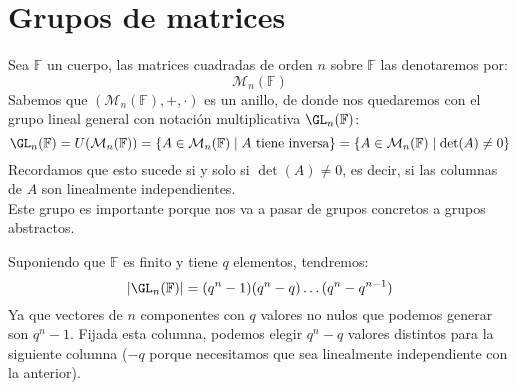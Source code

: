 \section{Grupos de matrices}
Sea $\mathbb{F}$ un cuerpo, las matrices cuadradas de orden $n$ sobre $\mathbb{F}$ las denotaremos por:
\begin{equation*}
    \mathcal{M}_n(\mathbb{F})
\end{equation*}
Sabemos que $(\mathcal{M}_n(\mathbb{F}), +, \cdot)$ es un anillo, de donde nos quedaremos con el grupo lineal general con notación multiplicativa $\GL_n(\mathbb{F})$:
\begin{equation*}
    \GL_n(\mathbb{F}) = U(\mathcal{M}_n(\mathbb{F})) = \{A\in \mathcal{M}_n(\mathbb{F}) \mid A \text{\ tiene inversa} \} = \{A \in \mathcal{M}_n(\mathbb{F})\mid \det(A)\neq 0 \}
\end{equation*}
Recordamos que esto sucede si y solo si $\det(A)\neq 0$, es decir, si las columnas de $A$ son linealmente independientes.\\

Este grupo es importante porque nos va a pasar de grupos concretos a grupos abstractos.

Suponiendo que $\mathbb{F}$ es finito y tiene $q$ elementos, tendremos:
\begin{equation*}
    |\GL_n(\mathbb{F})| = (q^n-1)(q^n-q) \ldots (q^n - q^{n-1})
\end{equation*}
Ya que vectores de $n$ componentes con $q$ valores no nulos que podemos generar son $q^n-1$. Fijada esta columna, podemos elegir $q^n-q$ valores distintos para la siguiente columna ($-q$ porque necesitamos que sea linealmente independiente con la anterior).

